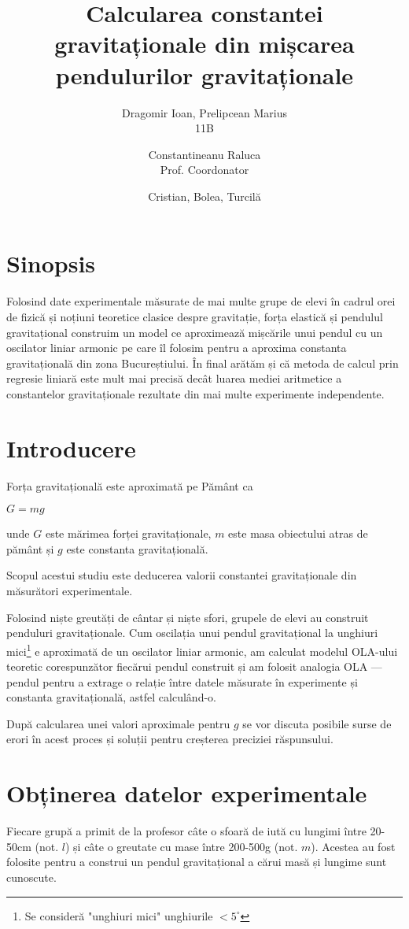 \documentclass{article}
\title{Calcularea constantei gravitaționale din mișcarea pendulurilor gravitaționale}
\author{Dragomir Ioan, Prelipcean Marius \\ 11B
	\and Constantineanu Raluca \\ Prof. Coordonator
	\and Cristian, Bolea, Turcilă}
\date{}
\begin{document}
\maketitle

\section{Sinopsis}
Folosind date experimentale măsurate de mai multe grupe de elevi în cadrul
orei de fizică și noțiuni te\-o\-re\-ti\-ce clasice despre gravitație, forța
elastică și pendulul gravitațional construim un model ce aproximează
mișcările unui pendul cu un oscilator liniar armonic pe care îl folosim
pentru a aproxima constanta gravitațională din zona Bucureștiului. În final
arătăm și că metoda de calcul prin regresie liniară este mult mai precisă
decât luarea mediei aritmetice a constantelor gravitaționale rezultate din
mai multe experimente independente.

\section{Introducere}

Forța gravitațională este aproximată pe Pământ ca

\begin{math}
	G = mg
\end{math}

unde $G$ este mărimea forței gravitaționale, $m$ este masa obiectului atras
de pământ și $g$ este constanta gravitațională.

Scopul acestui studiu este deducerea valorii constantei gravitaționale din
măsurători experimentale.

Folosind niște greutăți de cântar și niște sfori, grupele de elevi au construit
penduluri gravitaționale. Cum oscilația unui pendul gravitațional la unghiuri
mici\footnote{Se consideră "unghiuri mici" unghiurile $ <5^\circ $}
e aproximată de un oscilator liniar armonic, am calculat modelul OLA-ului
teoretic corespunzător fiecărui pendul construit și am folosit analogia OLA --- pendul
pentru a extrage o relație între datele măsurate în experimente și constanta
gravitațională, astfel calculând-o.

După calcularea unei valori aproximale pentru $g$ se vor discuta posibile surse
de erori în acest proces și soluții pentru creșterea preciziei răspunsului.

\section{Obținerea datelor experimentale}
Fiecare grupă a primit de la profesor câte o sfoară de iută cu lungimi
între 20-50cm (not. $l$) și câte o greutate cu mase între 200-500g (not. $m$). Acestea au
fost folosite pentru a construi un pendul gravitațional a cărui masă și
lungime sunt cunoscute.
\end{document}

